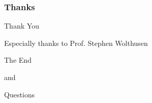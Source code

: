 \documentclass{beamer}
\begin{document}

\begin{frame}
	\frametitle{Thanks}
	\Huge{\centerline{Thank You}}
	\large \centerline{Especially thanks to Prof. Stephen Wolthusen}
\end{frame}


\begin{frame}
	\Huge{\centerline{The End}}
	\centerline{and}
	\Huge{\centerline{Questions}}
\end{frame}

\end{document}
